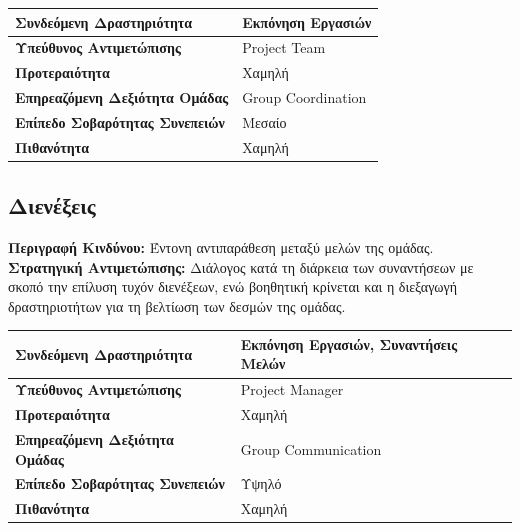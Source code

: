 \documentclass{article}
\newcommand\T{\rule{0pt}{2.6ex}}       %
\newcommand\B{\rule[-1.2ex]{0pt}{0pt}}
\begin{document}
 \begin{center}
     \begin{tabular}{|l|l|}
     \hline
      \textbf{Συνδεόμενη Δραστηριότητα}   & Εκπόνηση Εργασιών \T\B \\ 
      \hline
      \textbf{Υπεύθυνος Αντιμετώπισης} & Project Team \T\B \\
      \hline
      \textbf{Προτεραιότητα} & Χαμηλή \T\B \\
      \hline
      \textbf{Επηρεαζόμενη Δεξιότητα Ομάδας} & Group Coordination \T\B \\
      \hline
      \textbf{Επίπεδο Σοβαρότητας Συνεπειών} & Μεσαίο \T\B \\
      \hline
      \textbf{Πιθανότητα} & Χαμηλή \T\B \\
      \hline
     \end{tabular}
 \end{center}
 
 \newpage
 
 \subsection{Διενέξεις}
 
\textbf{Περιγραφή Κινδύνου:} Έντονη αντιπαράθεση μεταξύ μελών της ομάδας.\\

\textbf{Στρατηγική Αντιμετώπισης:} Διάλογος κατά τη διάρκεια των συναντήσεων με σκοπό την επίλυση τυχόν διενέξεων, ενώ βοηθητική κρίνεται και η διεξαγωγή δραστηριοτήτων για τη βελτίωση των δεσμών της ομάδας.
 
  \begin{center}
     \begin{tabular}{|l|l|}
     \hline
      \textbf{Συνδεόμενη Δραστηριότητα}   & Εκπόνηση Εργασιών, Συναντήσεις Μελών \T\B \\ 
      \hline
      \textbf{Υπεύθυνος Αντιμετώπισης} & Project Manager \T\B \\
      \hline
      \textbf{Προτεραιότητα} & Χαμηλή \T\B \\
      \hline
      \textbf{Επηρεαζόμενη Δεξιότητα Ομάδας} & Group Communication \T\B \\
      \hline
      \textbf{Επίπεδο Σοβαρότητας Συνεπειών} & Υψηλό \T\B \\
      \hline
      \textbf{Πιθανότητα} & Χαμηλή \T\B \\
      \hline
     \end{tabular}
 \end{center}
 
\end{document}
